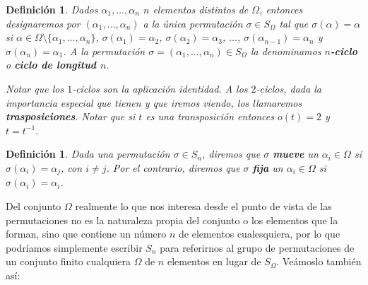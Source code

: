 \documentclass[12pt]{article}
\newtheorem{definition}[theorem]{Definición}
\begin{document}
\begin{definition}Dados $\alpha_1, \ldots, \alpha_n$ $n$ elementos distintos de $\Omega$, entonces designaremos por $(\alpha_1, \ldots, \alpha_n)$ a la única permutación $\sigma \in S_\Omega$ tal que $\sigma (\alpha) = \alpha$ si $\alpha \in \Omega \setminus \lbrace \alpha_1, \ldots, \alpha_n \rbrace$, $\sigma (\alpha_1)=\alpha_2$, $\sigma (\alpha_2) = \alpha_3$, $\ldots$, $\sigma(\alpha_{n-1}) = \alpha_n$ y $\sigma(\alpha_n) = \alpha_1$. A la permutación $\sigma = (\alpha_1, \ldots, \alpha_n ) \in S_\Omega$ la denominamos \textbf{$n$-ciclo} o \textbf{ciclo de longitud $n$}.

Notar que los $1$-ciclos son la aplicación identidad. A los $2$-ciclos, dada la importancia especial que tienen y que iremos viendo, los llamaremos \textbf{trasposiciones}. Notar que si $t$ es una transposición entonces $o(t)=2$ y $t=t^{-1}$.
\end{definition}

\begin{definition}Dada una permutación $\sigma \in S_n$, diremos que $\sigma$ \textbf{mueve} un $\alpha_i \in \Omega$ si $\sigma( \alpha_i) = \alpha_j$, con $i\neq j$. Por el contrario, diremos que $\sigma$ \textbf{fija} un $\alpha_i \in \Omega$ si $\sigma (\alpha_i ) = \alpha_i$.
\end{definition}

Del conjunto $\Omega$ realmente lo que nos interesa desde el punto de vista de las permutaciones no es la naturaleza propia del conjunto o los elementos que la forman, sino que contiene un número $n$ de elementos cualesquiera, por lo que podríamos simplemente escribir $S_n$ para referirnos al grupo de permutaciones de un conjunto finito cualquiera $\Omega$ de $n$ elementos en lugar de $S_\Omega$. Veámoslo también así:
\end{document}
